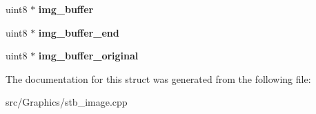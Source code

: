 \begin{DoxyCompactItemize}
\item 
\hypertarget{structstbi_aace36d5487a596bea5faa0aef0398ac8}{uint8 $\ast$ {\bfseries img\+\_\+buffer}}\label{structstbi_aace36d5487a596bea5faa0aef0398ac8}

\item 
\hypertarget{structstbi_a55f78565e605f1784d47fc9acea475f3}{uint8 $\ast$ {\bfseries img\+\_\+buffer\+\_\+end}}\label{structstbi_a55f78565e605f1784d47fc9acea475f3}

\item 
\hypertarget{structstbi_a261be6edda817862e623972b21b4f965}{uint8 $\ast$ {\bfseries img\+\_\+buffer\+\_\+original}}\label{structstbi_a261be6edda817862e623972b21b4f965}

\end{DoxyCompactItemize}


The documentation for this struct was generated from the following file\+:\begin{DoxyCompactItemize}
\item 
src/\+Graphics/stb\+\_\+image.\+cpp\end{DoxyCompactItemize}
